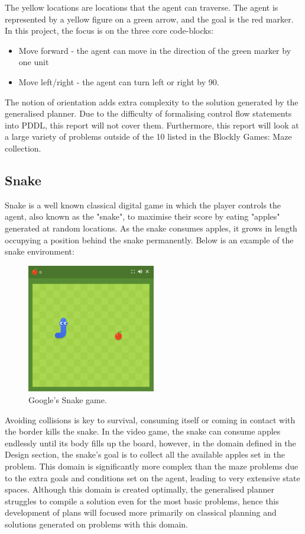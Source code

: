 \noindent The yellow locations are locations that the agent can traverse. The agent is represented by a yellow figure on a green arrow, and the goal is the red marker. In this project, the focus is on the three core code-blocks: 
\begin{itemize}
    \item Move forward - the agent can move in the direction of the green marker by one unit
    \item Move left/right - the agent can turn left or right by 90\degree.
\end{itemize}
The notion of orientation adds extra complexity to the solution generated by the generalised planner. Due to the difficulty of formalising control flow statements into PDDL, this report will not cover them. Furthermore, this report will look at a large variety of problems outside of the 10 listed in the Blockly Games: Maze collection.

\subsection{Snake}
Snake is a well known classical digital game in which the player controls the agent, also known as the "snake", to maximise their score by eating "apples" generated at random locations. As the snake consumes apples, it grows in length occupying a position behind the snake permanently. Below is an example of the snake environment:\\

\begin{figure}[h!]
\centering
\includegraphics[width=0.5\textwidth]{images/google_snake.png}
\caption{Google's Snake game.}
\end{figure}

\noindent Avoiding collisions is key to survival, consuming itself or coming in contact with the border kills the snake. In the video game, the snake can consume apples endlessly until its body fills up the board, however, in the domain defined in the Design section, the snake's goal is to collect all the available apples set in the problem. This domain is significantly more complex than the maze problems due to the extra goals and conditions set on the agent, leading to very extensive state spaces. Although this domain is created optimally, the generalised planner struggles to compile a solution even for the most basic problems, hence this development of plans will focused more primarily on classical planning and solutions generated on problems with this domain.